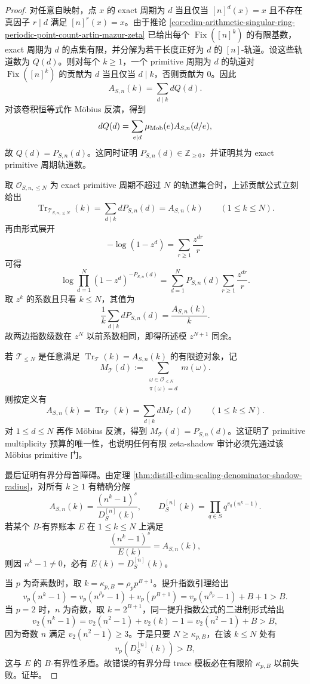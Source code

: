 \begin{proof}
对任意自映射，点 \(x\) 的 exact 周期为 \(d\) 当且仅当 \([n]^d(x)=x\) 且不存在真因子 \(r\mid d\) 满足 \([n]^r(x)=x\)。由于推论 \ref{cor:cdim-arithmetic-singular-ring-periodic-point-count-artin-mazur-zeta} 已给出每个 \(\operatorname{Fix}([n]^k)\) 的有限基数，exact 周期为 \(d\) 的点集有限，并分解为若干长度正好为 \(d\) 的 \([n]\)-轨道。设这些轨道数为 \(Q(d)\)。则对每个 \(k\ge1\)，一个 primitive 周期为 \(d\) 的轨道对 \(\operatorname{Fix}([n]^k)\) 的贡献为 \(d\) 当且仅当 \(d\mid k\)，否则贡献为 \(0\)。因此
\[
A_{S,n}(k)=\sum_{d\mid k}dQ(d).
\]
对该卷积恒等式作 Möbius 反演，得到
\[
dQ(d)=\sum_{e\mid d}\mu_{\rm Mob}(e)A_{S,n}(d/e),
\]
故 \(Q(d)=P_{S,n}(d)\)。这同时证明 \(P_{S,n}(d)\in\mathbb Z_{\ge0}\)，并证明其为 exact primitive 周期轨道数。

取 \(\mathcal O_{S,n,\le N}\) 为 exact primitive 周期不超过 \(N\) 的轨道集合时，上述贡献公式立刻给出
\[
\operatorname{Tr}_{\mathcal T_{S,n,\le N}}(k)=\sum_{d\mid k}dP_{S,n}(d)=A_{S,n}(k)
\qquad(1\le k\le N).
\]
再由形式展开
\[
-\log(1-z^d)=\sum_{r\ge1}\frac{z^{dr}}r
\]
可得
\[
\log\prod_{d=1}^{N}(1-z^d)^{-P_{S,n}(d)}
=\sum_{d=1}^{N}P_{S,n}(d)\sum_{r\ge1}\frac{z^{dr}}r.
\]
取 \(z^k\) 的系数且只看 \(k\le N\)，其值为
\[
\frac1k\sum_{d\mid k}dP_{S,n}(d)=\frac{A_{S,n}(k)}k.
\]
故两边指数级数在 \(z^N\) 以前系数相同，即得所述模 \(z^{N+1}\) 同余。

若 \(\mathcal T_{\le N}\) 是任意满足 \(\operatorname{Tr}_{\mathcal T}(k)=A_{S,n}(k)\) 的有限迹对象，记
\[
M_{\mathcal T}(d):=\sum_{\substack{\omega\in\mathcal O_{\le N}\\ \pi(\omega)=d}}m(\omega).
\]
则按定义有
\[
A_{S,n}(k)=\operatorname{Tr}_{\mathcal T}(k)=\sum_{d\mid k}dM_{\mathcal T}(d)
\qquad(1\le k\le N).
\]
对 \(1\le d\le N\) 再作 Möbius 反演，得到 \(M_{\mathcal T}(d)=P_{S,n}(d)\)。这证明了 primitive multiplicity 预算的唯一性，也说明任何有限 zeta-shadow 审计必须先通过该 Möbius primitive 门。

最后证明有界分母首障碍。由定理 \ref{thm:distill-cdim-scaling-denominator-shadow-radius}，对所有 \(k\ge1\) 有精确分解
\[
A_{S,n}(k)=\frac{(n^k-1)^s}{D^{[n]}_{S}(k)},
\qquad
D^{[n]}_{S}(k)=\prod_{q\in S}q^{v_q(n^k-1)}.
\]
若某个 \(B\)-有界账本 \(E\) 在 \(1\le k\le N\) 上满足
\[
\frac{(n^k-1)^s}{E(k)}=A_{S,n}(k),
\]
则因 \(n^k-1\ne0\)，必有 \(E(k)=D^{[n]}_{S}(k)\)。

当 \(p\) 为奇素数时，取 \(k=\kappa_{p,B}=\rho_p p^{B+1}\)。提升指数引理给出
\[
v_p(n^k-1)=v_p(n^{\rho_p}-1)+v_p(p^{B+1})
=v_p(n^{\rho_p}-1)+B+1>B.
\]
当 \(p=2\) 时，\(n\) 为奇数，取 \(k=2^{B+1}\)，同一提升指数公式的二进制形式给出
\[
v_2(n^k-1)=v_2(n^2-1)+v_2(k)-1
=v_2(n^2-1)+B>B,
\]
因为奇数 \(n\) 满足 \(v_2(n^2-1)\ge3\)。于是只要 \(N\ge\kappa_{p,B}\)，在该 \(k\le N\) 处有
\[
v_p(D^{[n]}_{S}(k))>B,
\]
这与 \(E\) 的 \(B\)-有界性矛盾。故错误的有界分母 trace 模板必在有限阶 \(\kappa_{p,B}\) 以前失败。证毕。
\end{proof}
